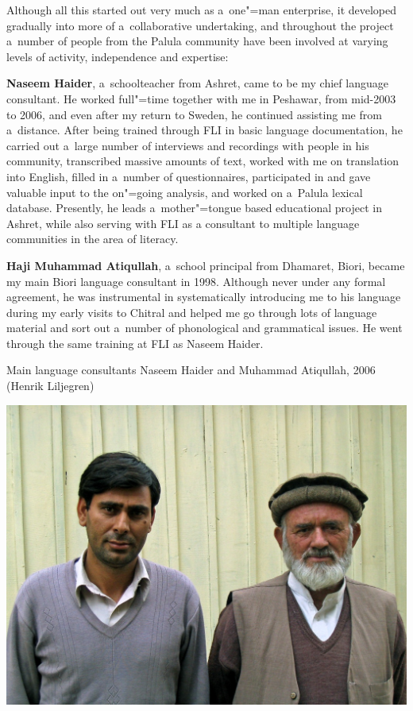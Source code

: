 Although all this started out very much as a~one"=man enterprise, it developed gradually into more of
a~collaborative undertaking, and throughout the project a~number of people from the Palula community
have been involved at varying levels of activity, independence and expertise:


\textbf{Naseem Haider}, a~schoolteacher from Ashret, came to be my chief language consultant. He
worked full"=time together with me in Peshawar, from mid-2003 to 2006, and even after my return to
Sweden, he continued assisting me from a~distance. After being trained through FLI in basic language documentation, he carried out a~large number of interviews and
recordings with people in his community, transcribed massive amounts of text, worked with me on
translation into English, filled in a~number of questionnaires, participated in and gave valuable
input to the on"=going analysis, and worked on a~Palula lexical database. Presently, he leads a~mother"=tongue based educational project in Ashret, while also serving with FLI as a consultant to multiple language communities in the area of literacy.


\textbf{Haji Muhammad Atiqullah}, a~school principal from Dhamaret, Biori, became my main Biori language
consultant in 1998. Although never under any formal agreement, he was instrumental in systematically
introducing me to his language during my early visits to Chitral and helped me go through lots of
language material and sort out a~number of phonological and grammatical issues. He went through the
same training at FLI as Naseem Haider.

\begin{photofigure}[t]
\caption{Main language consultants Naseem Haider and Muhammad Atiqullah, 2006 (Henrik Liljegren)}
\includegraphics[width=\textwidth]{figures/ch1photo1.jpg}
\end{photofigure}

